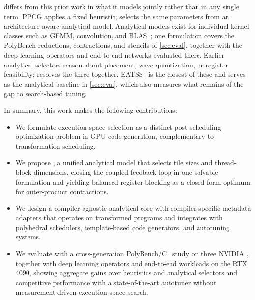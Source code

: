 \name differs from this prior work in what it models jointly rather than in any single term. PPCG applies a fixed heuristic; \name selects the same parameters from an architecture-aware analytical model. Analytical \gpu models exist for individual kernel classes such as GEMM, convolution, and BLAS~\cite{li-gemm,saday-conv,blis}; one \name formulation covers the PolyBench reductions, contractions, and stencils of \autoref{sec:eval}, together with the deep learning operators and end-to-end networks evaluated there. Earlier analytical selectors reason about placement, wave quantization, or register feasibility; \name resolves the three together. EATSS~\cite{eatss} is the closest of these and serves as the analytical baseline in \autoref{sec:eval}, which also measures what remains of the gap to search-based tuning.

In summary, this work makes the following contributions:
\begin{itemize}[
  leftmargin=1.4em,
  labelsep=0.45em,
  topsep=2pt plus 1pt minus 1pt,
  partopsep=0pt,
  itemsep=1pt plus 0.5pt minus 0.5pt,
  parsep=0pt
]
  \item We formulate \gpu execution-space selection as a distinct post-scheduling optimization problem in GPU code generation, complementary to transformation scheduling.
  \item We propose \name, a unified analytical model that selects tile sizes and thread-block dimensions, closing the coupled feedback loop in one solvable formulation and yielding balanced register blocking as a closed-form optimum for outer-product contractions.
  \item We design a compiler-agnostic analytical core with compiler-specific metadata adapters that operates on transformed programs and integrates with polyhedral schedulers, template-based code generators, and autotuning systems.
  \item We evaluate \name with a cross-generation PolyBench/C~\cite{polybench} study on three NVIDIA \gpus, together with deep learning operators and end-to-end workloads on the RTX 4090, showing aggregate gains over heuristics and analytical selectors and competitive performance with a state-of-the-art autotuner without measurement-driven execution-space search.
\end{itemize}

